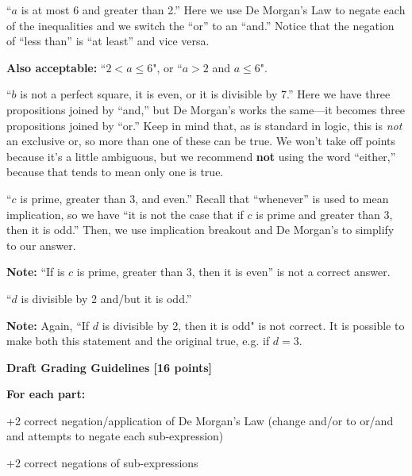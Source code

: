 \documentclass[12pt]{exam}
\begin{document}
\begin{solution}
\begin{qparts}
    \item ``$a$ is at most 6 and greater than 2.'' Here we use De Morgan's Law to negate each of the inequalities and we switch the ``or'' to an ``and.'' Notice that the negation of ``less than'' is ``at least'' and vice versa.
    
    \textbf{Also acceptable:} ``$2 < a \leq 6$", or ``$a > 2$ and $a \leq 6$".
    
    \item ``$b$ is not a perfect square, it is even, or it is divisible by 7.'' Here we have three propositions joined by ``and,'' but De Morgan's works the same---it becomes three propositions joined by ``or.'' Keep in mind that, as is standard in logic, this is \textit{not} an exclusive or, so more than one of these can be true. We won't take off points because it's a little ambiguous, but we recommend \textbf{not} using the word ``either,'' because that tends to mean only one is true.
    
    \item ``$c$ is prime, greater than 3, and even.'' Recall that ``whenever'' is used to mean implication, so we have ``it is not the case that if $c$ is prime and greater than 3, then it is odd.'' Then, we use implication breakout and De Morgan's to simplify to our answer.
    
    \textbf{Note:} ``If is $c$ is prime, greater than 3, then it is even'' is not a correct answer.
    
    \item ``$d$ is divisible by 2 and/but it is odd.''
    
    \textbf{Note:} Again, ``If $d$ is divisible by 2, then it is odd" is not correct.  It is possible to make both this statement and the original true, e.g. if $d=3$.
\end{qparts}

\smallskip
\textbf{Draft Grading Guidelines [16 points]}

\textbf{For each part:}
\begin{guidelines}
    \item +2 correct negation/application of De Morgan's Law (change and/or to or/and and attempts to negate each sub-expression)
    \item +2 correct negations of sub-expressions
\end{guidelines}
\end{solution}
\end{document}
